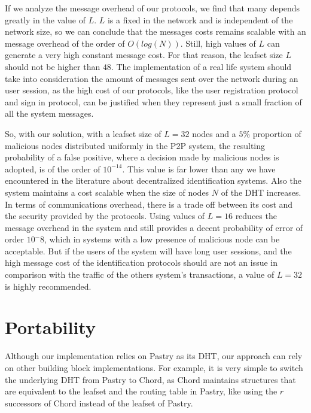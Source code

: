 If we analyze the message overhead of our protocols, we find that many depends
greatly in the value of $L$. $L$ is a fixed in the network and is
independent of the network size, so we can conclude that the messages costs
remains scalable with an message overhead of the order of $O(log(N))$.
 Still, high values of $L$ can generate a very high constant message cost. For that reason, the leafset size
$L$ should not be higher than $48$.  The implementation of a real life system
should take into consideration the amount of messages sent over the network
during an user session, as the high cost of our protocols, like the user
registration protocol and sign in protocol, can be justified when they represent just a
small fraction of all the system messages.

So, with our solution, with a leafset size of $L = 32$ nodes and a
$5\%$ proportion of malicious nodes distributed uniformly in the P2P system, the resulting probability of a false
positive, where a decision made by malicious nodes is adopted, is of the order
of $10^{-14}$. 
This value is far lower than any we have encountered in the
literature about decentralized identification systems. Also the system
maintains a cost scalable when the size of nodes $N$ of the DHT
increases. In terms of communications overhead, there is a trade off between its
cost and the security provided by the protocols. Using values of
$L = 16$ reduces the message overhead in the system and still provides a decent
probability of error of order $10^-8$, which in systems with a low presence of
malicious node can be acceptable. But if the users of the system
will have long user sessions, and the high message cost of the identification
protocols should are not an issue in comparison with the traffic of the others
system's transactions, a value of $L = 32$ is highly recommended. 


\section{Portability}

Although our implementation relies on Pastry as its DHT, our approach can rely
on other building block implementations. For example, it is very simple to
switch the underlying DHT from Pastry to Chord, as Chord maintains structures
that are equivalent to the leafset and the routing table in Pastry, like using
the $r$ successors of Chord instead of the leafset of Pastry.

